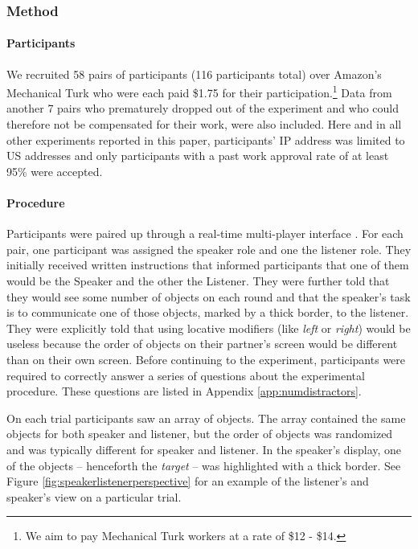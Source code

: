 \documentclass[11pt]{article}
\newcommand{\figref}[1]{Figure \ref{#1}}
\newcommand{\appref}[1]{Appendix \ref{#1}}
\begin{document}
\subsubsection{Method}

\paragraph{Participants}

We recruited 58 pairs of participants (116 participants total) over Amazon's Mechanical Turk who were each paid \$1.75 for their participation.\footnote{We aim to pay Mechanical Turk workers at a rate of \$12 - \$14.} Data from another 7 pairs who prematurely dropped out of the experiment and who could therefore not be compensated for their work, were also included. Here and in all other experiments reported in this paper, participants' IP address was limited to US addresses and only participants with a past work approval rate of at least 95\%  were accepted. 

\paragraph{Procedure}

Participants were paired up through a real-time multi-player interface \cite{Hawkins15_RealTimeWebExperiments}. For each pair, one participant was assigned the speaker role and one the listener role. They  initially received written instructions that informed participants that one of them would be the Speaker and the other the Listener. They were further told that they would see some number of objects on each round and that the speaker's task is to communicate one of those objects, marked by a thick border, to the listener. They were explicitly told that using locative modifiers (like \emph{left} or \emph{right}) would be useless because the order of objects on their partner's screen would be different than on their own screen. Before continuing to the experiment, participants were required to correctly answer a series of questions about the experimental procedure. These questions are listed in \appref{app:numdistractors}.

On each trial participants saw an array of objects. The array contained the same objects for both speaker and listener, but the order of objects was randomized and was typically different for speaker and listener. In the speaker's display, one of the objects -- henceforth the \emph{target} -- was highlighted with a thick border. See \figref{fig:speakerlistenerperspective} for an example of the listener's and speaker's view on a particular trial.
\end{document}
